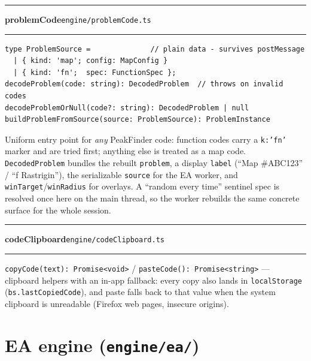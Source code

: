 \documentclass[11pt,a4paper]{report}
\newcommand{\srcfile}[1]{\texttt{\small #1}}   %
\newcommand{\ts}[1]{\texttt{#1}}               %
\newenvironment{apientry}[2]{%
  \par\medskip\noindent
  \begin{minipage}{\textwidth}
  \hrule\vspace{0.6ex}
  {\large\ttfamily\bfseries #1}\hfill{\footnotesize\srcfile{#2}}
  \vspace{0.4ex}\hrule\medskip
}{%
  \end{minipage}\par\medskip
}
\begin{document}
\begin{apientry}{problemCode}{engine/problemCode.ts}
\begin{lstlisting}
type ProblemSource =              // plain data - survives postMessage
  | { kind: 'map'; config: MapConfig }
  | { kind: 'fn';  spec: FunctionSpec };
decodeProblem(code: string): DecodedProblem  // throws on invalid codes
decodeProblemOrNull(code?: string): DecodedProblem | null
buildProblemFromSource(source: ProblemSource): ProblemInstance
\end{lstlisting}
Uniform entry point for \emph{any} PeakFinder code: function codes carry a
\ts{k:'fn'} marker and are tried first; anything else is treated as a map
code. \ts{DecodedProblem} bundles the rebuilt \ts{problem}, a display
\ts{label} (``Map \#ABC123'' / ``f Rastrigin''), the serializable
\ts{source} for the EA worker, and \ts{winTarget}/\ts{winRadius} for
overlays. A ``random every time'' sentinel spec is resolved once here on
the main thread, so the worker rebuilds the same concrete surface for the
whole session.
\end{apientry}

\begin{apientry}{codeClipboard}{engine/codeClipboard.ts}
\ts{copyCode(text): Promise<void>} / \ts{pasteCode(): Promise<string>} ---
clipboard helpers with an in-app fallback: every copy also lands in
\ts{localStorage} (\ts{bs.lastCopiedCode}), and paste falls back to that
value when the system clipboard is unreadable (Firefox web pages,
insecure origins).
\end{apientry}

\section{EA engine (\srcfile{engine/ea/})}
\end{document}
